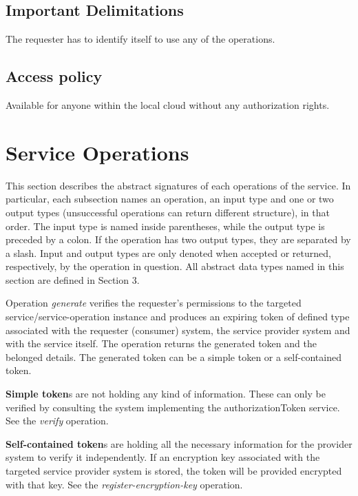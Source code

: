 \documentclass[a4paper]{arrowhead}
\begin{document}
\subsection{Important Delimitations}
\label{sec:delimitations}

The requester has to identify itself to use any of the operations.

\subsection{Access policy}
\label{sec:accesspolicy}

Available for anyone within the local cloud without any authorization rights.

\newpage

\section{Service Operations}
\label{sec:functions}

This section describes the abstract signatures of each operations of the service. In particular, each subsection names an operation, an input type and one or two output types (unsuccessful operations can return different structure), in that order.
The input type is named inside parentheses, while the output type is preceded by a colon. If the operation has two output types, they are separated by a slash.
Input and output types are only denoted when accepted or returned, respectively, by the operation in question. All abstract data types named in this section are defined in Section 3.

{}

Operation \textit{generate} verifies the requester’s permissions to the targeted service/service-operation instance and produces an expiring token of defined type associated with the requester (consumer) system, the service provider system and with the service itself. The operation returns the generated token and the belonged details. The generated token can be a simple token or a self-contained token.

\textbf{Simple token}s are not holding any kind of information. These can only be verified by consulting the system implementing the authorizationToken service. See the \textit{verify} operation.

\textbf{Self-contained token}s are holding all the necessary information for the provider system to verify it independently. If an encryption key associated with the targeted service provider system is stored, the token will be provided encrypted with that key. See the \textit{register-encryption-key} operation.
\end{document}
